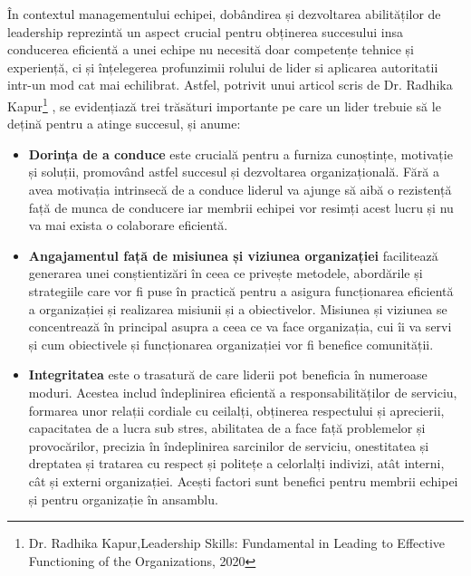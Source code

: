 \documentclass[a4paper, 12pt]{article}
\begin{document}
	\quad În contextul managementului echipei, dobândirea și dezvoltarea abilităților de leadership reprezintă un aspect crucial pentru obținerea succesului insa conducerea eficientă a unei echipe nu necesită doar competențe tehnice și experiență, ci și înțelegerea profunzimii rolului de lider si aplicarea autoritatii intr-un mod cat mai echilibrat. Astfel, potrivit unui articol scris de Dr. Radhika Kapur\footnote{Dr. Radhika Kapur,Leadership Skills: Fundamental in Leading to Effective Functioning of the Organizations, 2020} , se evidențiază trei trăsături importante pe care un lider trebuie să le dețină pentru a atinge succesul, și anume:

	\begin{itemize}
	\item \textbf {Dorința de a conduce} este crucială pentru a furniza cunoștințe, motivație și soluții, promovând astfel succesul și dezvoltarea organizațională. Fără a avea motivația intrinsecă de a conduce liderul va ajunge să aibă o rezistență față de munca de conducere iar membrii echipei vor resimți acest lucru și nu va mai exista o colaborare eficientă.

	 \item \textbf{Angajamentul față de misiunea și viziunea organizației} facilitează generarea unei conștientizări în ceea ce privește metodele, abordările și strategiile care vor fi puse în practică pentru a asigura funcționarea eficientă a organizației și realizarea misiunii și a obiectivelor. Misiunea și viziunea se concentrează în principal asupra a ceea ce va face organizația, cui îi va servi și cum obiectivele și funcționarea organizației vor fi benefice comunității. 

	 \item\textbf{Integritatea} este o trasatură de care liderii pot beneficia în numeroase moduri. Acestea includ îndeplinirea eficientă a responsabilităților de serviciu, formarea unor relații cordiale cu ceilalți, obținerea respectului și aprecierii, capacitatea de a lucra sub stres, abilitatea de a face față problemelor și provocărilor, precizia în îndeplinirea sarcinilor de serviciu, onestitatea și dreptatea și tratarea cu respect și politețe a celorlalți indivizi, atât interni, cât și externi organizației. Acești factori sunt benefici pentru membrii echipei și pentru organizație în ansamblu. 

\end{itemize}
\end{document}
